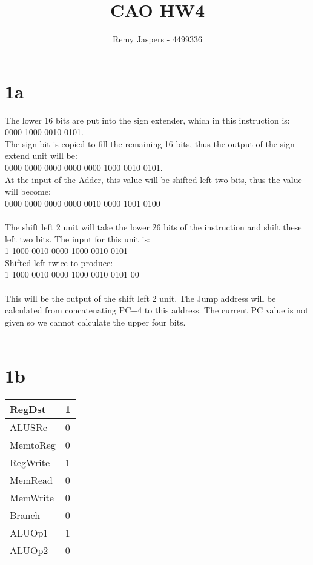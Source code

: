 \documentclass[10pt,a4paper]{article}
\author{Remy Jaspers - 4499336}
\title{CAO HW4}
\begin{document}
	\maketitle
	\section*{1a}
	The lower 16 bits are put into the sign extender, which in this instruction is: \\
	0000 1000 0010 0101. \\
	The sign bit is copied to fill the remaining 16 bits, thus the output of the sign extend unit will be:\\
	0000 0000 0000 0000 0000 1000 0010 0101. \\
	At the input of the Adder, this value will be shifted left two bits, thus the value will become:\\
	0000 0000 0000 0000 0010 0000 1001 0100\\\\
	The shift left 2 unit will take the lower 26 bits of the instruction and shift these left two bits. The input for this unit is:\\
	1 1000 0010 0000 1000 0010 0101 \\
	Shifted left twice to produce:\\
	1 1000 0010 0000 1000 0010 0101 00\\\\
	This will be the output of the shift left 2 unit. The Jump address will be calculated from concatenating PC+4 to this address. The current PC value is not given so we cannot calculate the upper four bits.\\\\

	\section*{1b}
	\begin{table}[h]
		\centering
		\label{my-label}
		\begin{tabular}{|l|l|}
			\hline
		RegDst	&  1\\ \hline
		ALUSRc	& 0 \\ \hline
		MemtoReg & 0  \\ \hline
		RegWrite&  1 \\ \hline
		MemRead 	&  0\\ \hline
		MemWrite	&  0 \\ \hline
		Branch 	&  0\\  \hline
	 	ALUOp1	&  1\\ \hline
  		ALUOp2	&  0\\  \hline \end{tabular}
	\end{table}
\end{document}
